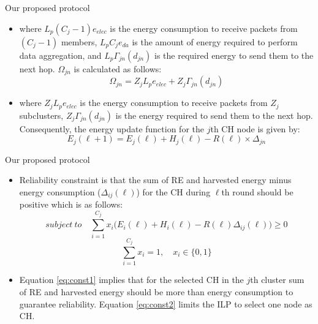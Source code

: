 \documentclass{beamer}
\begin{document}
\begin{frame}[t]{Our proposed protocol} %
\begin{itemize}
\small
\justifying
\item where $L_p(C_j-1)e_{elec}$ is the energy consumption to receive packets from $(C_j-1)$ members, $L_pC_je_{da}$ is the amount of energy required to perform data aggregation, and $L_p\Gamma_{jn}(d_{jn})$ is the required energy to send them to the next hop. $\Omega_{jn}$ is calculated as follows:
\begin{equation}
\Omega_{jn}=Z_jL_pe_{elec}+Z_j\Gamma_{jn}(d_{jn})
\end{equation}
\item where $Z_jL_pe_{elec}$ is the energy consumption to receive packets from $Z_j$ subclusters, $Z_j\Gamma_{jn}(d_{jn})$ is the energy required to send them to the next hop. Consequently, the energy update function for the $j$th CH node is given by:
\begin{equation}
E_j(\ell+1)=E_j(\ell)+H_j(\ell)-R(\ell)\times \Delta_{jn}
\end{equation}
\end{itemize}
\end{frame}


\begin{frame}[t]{Our proposed protocol} %
\begin{itemize}
\small
\justifying
\item Reliability constraint is that the sum of RE and harvested energy minus energy consumption ($\Delta_{ij}(\ell)$) for the CH during $\ell$th round should be positive which is as follows:
\begin{equation}
subject\ to\quad \sum_{i=1}^{C_j}x_i\Big(E_i(\ell)+H_i(\ell)-R(\ell)\Delta_{ij}(\ell)\Big)\geq0
\label{eq:const1}
\end{equation}
\begin{equation}
\sum_{i=1}^{C_j}x_i=1, \quad x_i\in \{0,1\}
\label{eq:const2}
\end{equation}
\item Equation \ref{eq:const1} implies that for the selected CH in the $j$th cluster sum of RE and harvested energy should be more than energy consumption to guarantee reliability. Equation \ref{eq:const2} limits the ILP to select one node as CH.
\end{itemize}
\end{frame}
\end{document}
